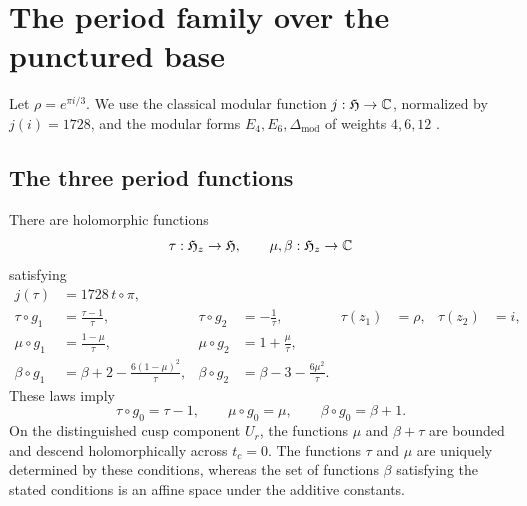 \section{The period family over the punctured base}

Let $\rho=e^{\pi i/3}$.  We use the classical modular function
$j:\mathfrak H\to\mathbb C$, normalized by $j(i)=1728$, and the modular forms
$E_4,E_6,\Delta_{\mathrm{mod}}$ of weights $4,6,12$ \cite[Ch.~VII]{Serre}.

\subsection{The three period functions}

\begin{theorem}[Periods]\label{thm:periods}
There are holomorphic functions
\[
 \tau:\mathfrak H_z\to\mathfrak H,
 \qquad
 \mu,\beta:\mathfrak H_z\to\mathbb C
\]
satisfying
\begin{align}
 j(\tau)&=1728\,t\circ\pi,\label{eq:tau-j}\\
 \tau\circ g_1&=\frac{\tau-1}{\tau},
 &\tau\circ g_2&=-\frac1\tau,
 &\tau(z_1)&=\rho,
 &\tau(z_2)&=i,\label{eq:tau-law}\\
 \mu\circ g_1&=\frac{1-\mu}{\tau},
 &\mu\circ g_2&=1+\frac\mu\tau,
 \label{eq:mu-law}\\
 \beta\circ g_1&=\beta+2-\frac{6(1-\mu)^2}{\tau},
 &\beta\circ g_2&=\beta-3-\frac{6\mu^2}{\tau}.
 \label{eq:beta-law}
\end{align}
These laws imply
\begin{equation}\label{eq:cusp-period-laws}
 \tau\circ g_0=\tau-1,
 \qquad
 \mu\circ g_0=\mu,
 \qquad
 \beta\circ g_0=\beta+1.
\end{equation}
On the distinguished cusp component $U_r$, the functions $\mu$ and
$\beta+\tau$ are bounded and descend holomorphically across $t_c=0$.
The functions $\tau$ and $\mu$ are uniquely determined by these conditions,
whereas the set of functions $\beta$ satisfying the stated conditions is
an affine space under the additive constants.
\end{theorem}

